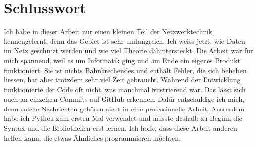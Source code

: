 \chapter{Schlusswort}
\label{chap:Schlusswort}

Ich habe in dieser Arbeit nur einen kleinen Teil der Netzwerktechnik kennengelernt, denn das Gebiet ist sehr umfangreich. Ich weiss jetzt, wie Daten im Netz geschützt werden und wie viel Theorie dahintersteckt. Die Arbeit war für mich spannend, weil es um Informatik ging und am Ende ein eigenes Produkt funktioniert. Sie ist nichts Bahnbrechendes und enthält Fehler, die sich beheben liessen, hat aber trotzdem sehr viel Zeit gebraucht. Während der Entwicklung funktionierte der Code oft nicht, was manchmal frustrierend war. Das lässt sich auch an einzelnen Commits auf GitHub erkennen. Dafür entschuldige ich mich, denn solche Nachrichten gehören nicht in eine professionelle Arbeit. Ausserdem habe ich Python zum ersten Mal verwendet und musste deshalb zu Beginn die Syntax und die Bibliotheken erst lernen. Ich hoffe, dass diese Arbeit anderen helfen kann, die etwas Ähnliches programmieren möchten.
